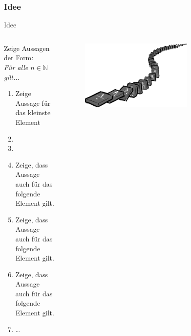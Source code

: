 \subsubsection{Idee}
\begin{frame}[fragile]{Idee}
\begin{columns}
    \begin{alertblock}{Zeige Aussagen der Form:\\\emph{Für alle $n\in\mathbb{N}$ gilt...}}
    \begin{enumerate}
        \item Zeige Aussage für das kleinste Element
        \item<1-> 
        \item<2-6,8> 
        \item<3-6> \footnotesize Zeige, dass Aussage auch für das folgende Element gilt.
        \item<4-6> \scriptsize Zeige, dass Aussage auch für das folgende Element gilt.
        \item<5-6> \tiny Zeige, dass Aussage auch für das folgende Element gilt.
        \item<6> \dots
    \end{enumerate}
    \end{alertblock}
    \begin{figure}
        \centering
        \includegraphics[width=0.7\textwidth]{../figures/induction.png}
    \end{figure}
\end{columns}
\end{frame}

